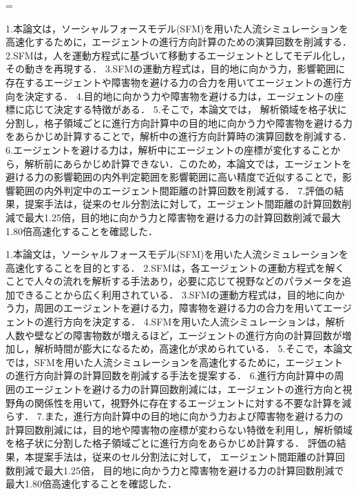 
={
1.本論文は，ソーシャルフォースモデル(SFM)を用いた人流シミュレーションを高速化するために，エージェントの進行方向計算のための演算回数を削減する．
2.SFMは，人を運動方程式に基づいて移動するエージェントとしてモデル化し，その動きを再現する．
3.SFMの運動方程式は，目的地に向かう力，影響範囲に存在するエージェントや障害物を避ける力の合力を用いてエージェントの進行方向を決定する．
4.目的地に向かう力や障害物を避ける力は，エージェントの座標に応じて決定する特徴がある．
5.そこで，本論文では，
解析領域を格子状に分割し，格子領域ごとに進行方向計算中の目的地に向かう力や障害物を避ける力をあらかじめ計算することで，解析中の進行方向計算時の演算回数を削減する．
6.エージェントを避ける力は，解析中にエージェントの座標が変化することから，解析前にあらかじめ計算できない．このため，本論文では，エージェントを避ける力の影響範囲の内外判定範囲を影響範囲に高い精度で近似することで，影響範囲の内外判定中のエージェント間距離の計算回数を削減する．
7.評価の結果，提案手法は，従来のセル分割法に対して，エージェント間距離の計算回数削減で最大1.25倍，目的地に向かう力と障害物を避ける力の計算回数削減で最大1.80倍高速化することを確認した．

1.本論文は，ソーシャルフォースモデル(SFM)を用いた人流シミュレーションを高速化することを目的とする．
2.SFMは，各エージェントの運動方程式を解くことで人々の流れを解析する手法あり，必要に応じて視野などのパラメータを追加できることから広く利用されている．
3.SFMの運動方程式は，目的地に向かう力，周囲のエージェントを避ける力，障害物を避ける力の合力を用いてエージェントの進行方向を決定する．
4.SFMを用いた人流シミュレーションは，解析人数や壁などの障害物数が増えるほど，エージェントの進行方向の計算回数が増加し，解析時間が膨大になるため，高速化が求められている．
5.そこで，本論文では，SFMを用いた人流シミュレーションを高速化するために，エージェントの進行方向計算の計算回数を削減する手法を提案する．
6.進行方向計算中の周囲のエージェントを避ける力の計算回数削減には，エージェントの進行方向と視野角の関係性を用いて，視野外に存在するエージェントに対する不要な計算を減らす．
7.また，進行方向計算中の目的地に向かう力および障害物を避ける力の計算回数削減には，目的地や障害物の座標が変わらない特徴を利用し，解析領域を格子状に分割した格子領域ごとに進行方向をあらかじめ計算する．
評価の結果，本提案手法は，従来のセル分割法に対して，
エージェント間距離の計算回数削減で最大1.25倍，
目的地に向かう力と障害物を避ける力の計算回数削減で最大1.80倍高速化することを確認した．
\fi
}

